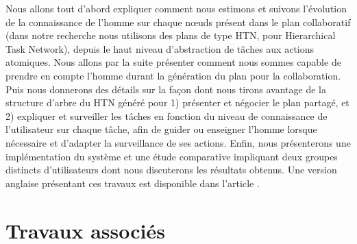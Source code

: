\documentclass[a4paper,11pt,twoside]{StyleThese}
\begin{document}
Nous allons tout d'abord expliquer comment nous estimons et suivons l'évolution de la connaissance de l'homme sur chaque nœuds présent dans le plan collaboratif (dans notre recherche nous utilisons des plans de type HTN, pour Hierarchical Task Network), depuis le haut niveau d'abstraction de tâches aux actions atomiques. Nous allons par la suite présenter comment nous sommes capable de prendre en compte l'homme durant la génération du plan pour la collaboration. Puis nous donnerons des détails sur la façon dont nous tirons avantage de la structure d'arbre du HTN généré pour 1) présenter et négocier le plan partagé,
et 2) expliquer et surveiller les tâches en fonction du niveau de connaissance de l'utilisateur sur chaque tâche, afin de guider ou enseigner l'homme lorsque nécessaire et d'adapter la surveillance de ses actions. Enfin, nous présenterons une implémentation du système et une étude comparative impliquant deux groupes distincts d'utilisateurs dont nous discuterons les résultats obtenus.
Une version anglaise présentant ces travaux est disponible dans l'article \cite{Milliez16}.




\section{Travaux associés}



\end{document}
